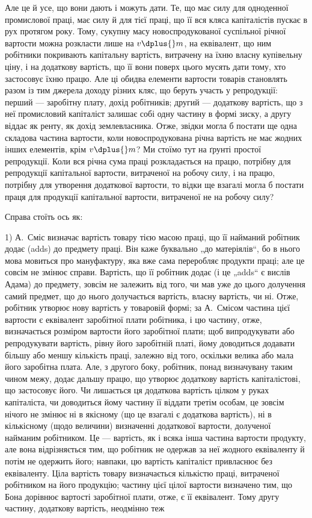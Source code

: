 \parcont{}  %
Але це й усе, що вони дають і можуть дати. Те, що має силу для одноденної промислової праці, має
силу й для тієї праці, що її вся кляса капіталістів пускає в рух протягом року. Тому, сукупну масу
новоспродукованої суспільної річної вартости можна розкласти лише на $v \dplus{} m$, на еквівалент, що ним
робітники покривають капітальну вартість, витрачену на їхню власну купівельну ціну, і на додаткову
вартість, що її вони поверх цього мусять дати тому, хто застосовує їхню працю. Але ці обидва
елементи вартости товарів становлять разом із тим джерела доходу різних кляс, що беруть участь у
репродукції: перший — заробітну плату, дохід робітників; другий — додаткову вартість, що з неї
промисловий капіталіст залишає собі одну частину в формі зиску, а другу віддає як ренту, як дохід
землевласника. Отже, звідки могла б постати ще одна складова частина вартости, коли новоспродукована
річна вартість не має жодних інших елементів, крім $v \dplus{} m$? Ми стоїмо тут на ґрунті простої
репродукції. Коли вся річна сума праці розкладається на працю, потрібну для репродукції капітальної
вартости, витраченої на робочу силу, і на працю, потрібну для утворення додаткової вартости, то
відки ще взагалі могла б постати праця для продукції капітальної вартости, витраченої не на робочу
силу?

Справа стоїть ось як:

1) А.~Сміс визначає вартість товару тією масою праці, що її найманий робітник додає (adds) до
предмету праці. Він каже буквально „до матеріялів“, бо в нього мова мовиться про мануфактуру, яка
вже сама переробляє продукти праці; але це совсім не змінює справи. Вартість, що її робітник додає
(і це „adds“ є вислів Адама) до предмету, зовсім
не залежить від того, чи мав уже до цього долучення самий предмет, що до нього долучається вартість,
власну вартість, чи ні. Отже, робітник утворює нову вартість у товаровій формі; за А.~Смісом частина
цієї вартости є еквівалент заробітної плати робітника, і цю частину, отже, визначається розміром
вартости його заробітної плати; щоб випродукувати або репродукувати вартість, рівну його заробітній
платі, йому
доводиться додавати більшу або меншу кількість праці, залежно від того, оскільки велика або мала
його заробітна плата. Але, з другого боку, робітник, понад визначувану таким чином межу, додає
дальшу працю, що утворює додаткову вартість капіталістові, що застосовує його. Чи лишається ця
додаткова вартість цілком у руках капіталіста, чи доводиться йому частину її віддати третім особам,
це зовсім нічого не змінює ні в якісному (що це взагалі є додаткова вартість), ні в кількісному
(щодо величини) визначенні додаткової вартости, долученої найманим робітником. Це — вартість, як і
всяка інша частина вартости продукту, але вона відрізняється тим, що робітник не одержав за неї
жодного еквіваленту й потім не одержить його; навпаки, цю вартість капіталіст привласнює без
еквіваленту. Ціла вартість товару визначається кількістю
праці, витраченої робітником на його продукцію; частину цієї цілої вартости визначено тим, що Бона
дорівнює вартості заробітної плати, отже, є її еквівалент. Тому другу частину, додаткову вартість,
неодмінно теж
\parbreak{}  %
